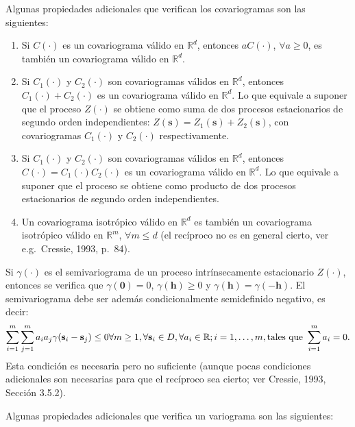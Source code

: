\documentclass[
]{book}
\theoremstyle{break}
\theoremstyle{definition}
\theoremstyle{definition}
\theoremstyle{definition}
\theoremstyle{definition}
\theoremstyle{remark}
\begin{document}
Algunas propiedades adicionales que verifican los covariogramas son las siguientes:

\begin{enumerate}
\def\labelenumi{\arabic{enumi}.}
\item
  Si \(C(\cdot)\) es un covariograma válido en \(\mathbb{R}^d\), entonces \(aC(\cdot)\), \(\forall a\geq 0\), es
  también un covariograma válido en \(\mathbb{R}^d\).
\item
  Si \(C_1 (\cdot)\) y \(C_2 (\cdot)\) son covariogramas válidos en \(\mathbb{R}^d\), entonces \(C_1 (\cdot) + C_2 (\cdot)\) es un
  covariograma válido en \(\mathbb{R}^d\). Lo que equivale a suponer que el proceso \(Z(\cdot)\) se obtiene como suma de dos procesos estacionarios de segundo orden independientes: \(Z(\mathbf{s})=Z_1 (\mathbf{s}) + Z_2 (\mathbf{s})\), con covariogramas \(C_1 (\cdot)\) y \(C_2 (\cdot)\) respectivamente.
\item
  Si \(C_1 (\cdot)\) y \(C_2 (\cdot)\) son covariogramas válidos en \(\mathbb{R}^d\), entonces \(C(\cdot) = C_1 (\cdot)C_2 (\cdot)\)
  es un covariograma válido en \(\mathbb{R}^d\). Lo que equivale a suponer que el proceso se obtiene como producto de dos procesos estacionarios de segundo orden independientes.
\item
  Un covariograma isotrópico válido en \(\mathbb{R}^d\) es también un covariograma isotrópico válido en \(\mathbb{R}^m\), \(\forall m\leq d\) (el recíproco no es en general cierto, ver e.g.~Cressie, 1993, p.~84).
\end{enumerate}

Si \(\gamma (\cdot)\) es el semivariograma de un proceso intrínsecamente estacionario \(Z(\cdot)\), entonces se verifica que \(\gamma (\mathbf{0})=0\), \(\gamma (\mathbf{h})\geq 0\) y \(\gamma (\mathbf{h})=\gamma (-\mathbf{h})\).
El semivariograma debe ser además condicionalmente semidefinido negativo, es decir:
\[\sum\limits_{i=1}^{m}\sum\limits_{j=1}^{m}a_i a_j \gamma(\mathbf{s}_i -\mathbf{s}_j) \leq 0  \\
\forall m\geq 1,\forall \mathbf{s}_i \in D,\forall a_i \in \mathbb{R};i=1, \ldots,m,\text{tales que } \sum\limits_{i=1}^{m}a_i = 0.\]
Esta condición es necesaria pero no suficiente (aunque pocas condiciones adicionales son necesarias para que el recíproco sea cierto; ver Cressie, 1993, Sección 3.5.2).

Algunas propiedades adicionales que verifica un variograma son las siguientes:
\end{document}
